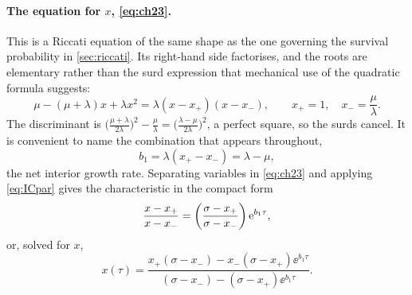 \paragraph{The equation for $x$, \eqref{eq:ch23}.}
This is a Riccati equation of the same shape as the one governing the survival
probability in \cref{sec:riccati}. Its right-hand side factorises, and the roots
are elementary rather than the surd expression that mechanical use of the quadratic
formula suggests:
\begin{equation}
\label{eq:xpm}
\mu-(\mu+\lambda)x+\lambda x^2 = \lambda(x-x_+)(x-x_-),
\qquad
x_+ = 1,\quad x_- = \frac{\mu}{\lambda} .
\end{equation}
The discriminant is
$\bigl(\tfrac{\mu+\lambda}{2\lambda}\bigr)^2 - \tfrac{\mu}{\lambda}
= \bigl(\tfrac{\lambda-\mu}{2\lambda}\bigr)^2$, a perfect square, so the surds
cancel. It is convenient to name the combination that appears throughout,
\begin{equation}
\label{eq:b1}
b_1 = \lambda(x_+-x_-) = \lambda-\mu ,
\end{equation}
the net interior growth rate. Separating variables in \cref{eq:ch23} and applying
\cref{eq:ICpar} gives the characteristic in the compact form
\begin{equation}
\label{eq:xratio}
\frac{x-x_+}{x-x_-} = \left(\frac{\sigma-x_+}{\sigma-x_-}\right)\mathrm{e}^{b_1\tau},
\end{equation}
or, solved for $x$,
\begin{equation}
\label{eq:xabd}
x(\tau) = \frac{x_+(\sigma-x_-) - x_-(\sigma-x_+)\ee^{b_1\tau}}
{(\sigma-x_-) - (\sigma-x_+)\ee^{b_1\tau}} .
\end{equation}

